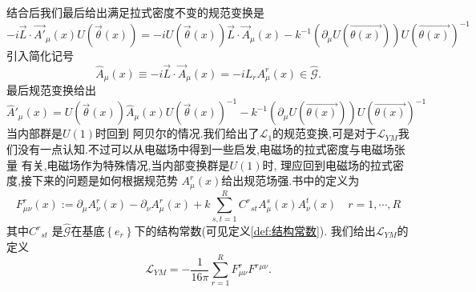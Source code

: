 \documentclass[../main.tex]{subfiles}
\begin{document}
 结合后我们最后给出满足拉式密度不变的规范变换是
 \begin{equation*}
  - i  \vec{L} \cdot\vec{A'}_\mu(x)U(\vec{\theta}(x)) = -i U(\vec{\theta}(x))\vec{L} \cdot \vec{A}_\mu(x)   - k^{-1}(\partial_\mu U(\vec{\theta(x)}))U(\vec{\theta(x)})^{-1}
 \end{equation*}
 引入简化记号\[
 \hat{A}_\mu(x) \equiv -i \vec{L} \cdot \vec{A}_\mu(x) = -i L_r A^r_\mu(x) \in \hat{\mathscr{G}} 
 .\] 
 最后规范变换给出
 \begin{equation}
 \label{eq:I-5-2} 
 \hat{A}'_\mu(x) = U(\vec{\theta}(x))\hat{A}_\mu(x)U(\vec{\theta}(x))^{-1} - k^{-1}(\partial_\mu U(\vec{\theta(x)}))U(\vec{\theta(x)})^{-1}
 \end{equation}
 当内部群是$U(1)$时回到 阿贝尔的情况.我们给出了$\mathscr{L}_1$的规范变换,可是对于$\mathscr{L}_{Y\!M}$我们没有一点认知.不过可以从电磁场中得到一些启发,电磁场的拉式密度与电磁场张量
 有关,电磁场作为特殊情况,当内部变换群是$U(1)$时, 理应回到电磁场的拉式密度,接下来的问题是如何根据规范势 $A^r_\mu(x)$给出规范场强.书中的定义为
\begin{equation}
  \label{eq:I-5-3}
F^r_{\mu\nu}(x) := \partial_\mu A^r_\nu(x) - \partial_\nu A^r_\mu(x) + k \sum^{R}_{s,t = 1} C^{r}{}_{st}A^s_\mu(x)A^t_\nu(x) \quad r = 1 ,\cdots ,R
 \end{equation}
 其中$C^{r}{}_{st}$ 是$\hat{\mathscr{G}}$在基底$\left\{ e_r \right\} $下的结构常数(可见定义\ref{def:结构常数}).
 我们给出$\mathscr{L}_{Y\!M}$的定义\[
 \mathscr{L}_{Y\!M} = -\frac{1}{16\pi}\sum_{r = 1}^{R} F^r_{\mu\nu}F^{r}{}^{\mu\nu}
 .\]
\end{document}
